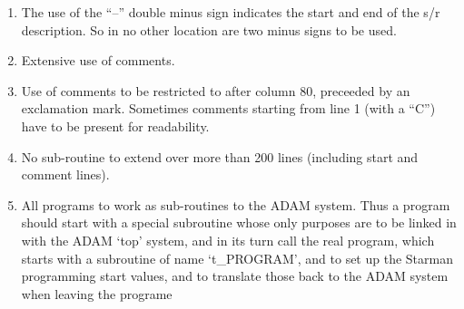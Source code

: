 \begin{enumerate}
\item The use of the ``--'' double minus sign indicates the start and
      end of the s/r description. So in no other location are two minus
      signs to be used.

\item Extensive use of comments.

\item Use of comments to be restricted to after column 80, preceeded
      by an exclamation mark. Sometimes comments starting from line 1
      (with a ``C'') have to be present for readability.

\item No sub-routine to extend over more than 200 lines (including
      start and comment lines).

\item All programs to work as sub-routines to the ADAM system. Thus a
      program should start with a special subroutine whose only
      purposes are to be linked in with the ADAM `top' system, and in
      its turn call the real program, which starts with a subroutine of
      name `t\_PROGRAM', and to set up the Starman programming start
      values, and to translate those back to the ADAM system when
      leaving the programe


\end{enumerate}
